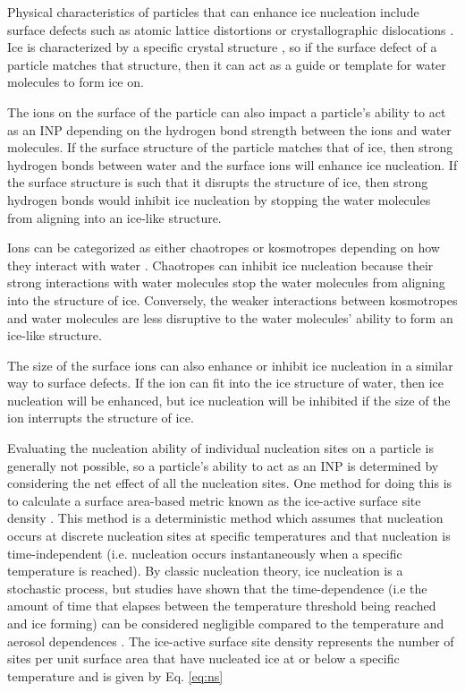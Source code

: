 Physical characteristics of particles that can enhance ice nucleation include surface defects such as atomic lattice distortions or crystallographic dislocations \citep{murp2003,zol2015}. Ice is characterized by a specific crystal structure \citep{hobbs1974,male2009,bai2012}, so if the surface defect of a particle matches that structure, then it can act as a guide or template for water molecules to form ice on.

The ions on the surface of the particle can also impact a particle's ability to act as an INP depending on the hydrogen bond strength between the ions and water molecules. If the surface structure of the particle matches that of ice, then strong hydrogen bonds between water and the surface ions will enhance ice nucleation. If the surface structure is such that it disrupts the structure of ice, then strong hydrogen bonds would inhibit ice nucleation by stopping the water molecules from aligning into an ice-like structure. \citep{murp2003,zol2015}

Ions can be categorized as either chaotropes or kosmotropes depending on how they interact with water \citep{marc2009, zol2015}. Chaotropes can inhibit ice nucleation because their strong interactions with water molecules stop the water molecules from aligning into the structure of ice. Conversely, the weaker interactions between kosmotropes and water molecules are less disruptive to the water molecules' ability to form an ice-like structure. 

The size of the surface ions can also enhance or inhibit ice nucleation in a similar way to surface defects. If the ion can fit into the ice structure of water, then ice nucleation will be enhanced, but ice nucleation will be inhibited if the size of the ion interrupts the structure of ice.

Evaluating the nucleation ability of individual nucleation sites on a particle is generally not possible, so a particle's ability to act as an INP is determined by considering the net effect of all the nucleation sites. One method for doing this is to calculate a surface area-based metric known as the ice-active surface site density \citep{con2009}. This method is a deterministic method which assumes that nucleation occurs at discrete nucleation sites at specific temperatures and that nucleation is time-independent (i.e. nucleation occurs instantaneously when a specific temperature is reached). By classic nucleation theory, ice nucleation is a stochastic process, but studies have shown that the time-dependence (i.e the amount of time that elapses between the temperature threshold being reached and ice forming) can be considered negligible compared to the temperature and aerosol dependences \citep[e.g.][]{con2009, broa2012, mur2012, erv2013, hira2015}. The ice-active surface site density represents the number of sites per unit surface area that have nucleated ice at or below a specific temperature and is given by Eq. \ref{eq:ns}


